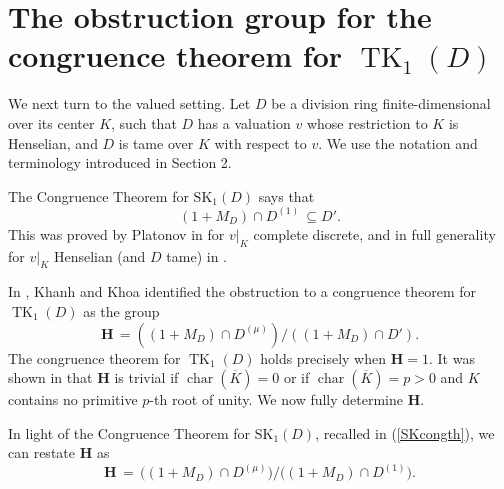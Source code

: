 \documentclass[11pt]{article}
\numberwithin{equation}{section}
\theoremstyle{plain}
\theoremstyle{remark}
\newcommand{\opn}{\operatorname}
\newcommand{\SK}{\opn{SK_1}}
\newcommand{\Dmu}{D^{(\mu)}}
\newcommand{\charr}{\opn{char}}
\newcommand{\ov}{\overline}
\newcommand{\bH}{\mathbf{H}}
\begin{document}
\section{The obstruction group for the congruence theorem for $\operatorname{TK}_1(D)$}\label{sec:obstruction-group}

We next turn to the valued setting.  Let $D$ be a division ring finite-dimensional over its center $K$,  such that 
$D$ has a valuation $v$ whose restriction to $K$ is Henselian, and $D$ is tame over $K$ with respect to $v$.
We use the notation and terminology introduced in Section 2. 

The Congruence Theorem for $\SK(D)$ says that 
\begin{equation}
\label{SKcongth}
(1+M_D) \cap D^{(1)} \, \subseteq D'.
\end{equation}
This was proved by Platonov in \cite{platonov-1976} for $v|_K$ complete discrete, and in full generality for $v|_K$
Henselian (and $D$ tame) in \cite{hazrat-wadsworth-2011}.  



In \cite{khanh-khoa-2025}, Khanh and Khoa identified the obstruction to a congruence theorem for 
$\operatorname{TK}_1(D)$
as the group 
$$
 \bH\,=((1+M_D)\cap D^{(\mu)})\big/((1+M_D)\cap D').
$$
The congruence theorem for $\operatorname{TK}_1(D)$ holds precisely when $\mathbf{H}=1$. 
It was shown in \cite{khanh-khoa-2025} that $\bH$ is trivial if $\charr(\ov K) = 0$ or if 
$\charr(\ov K) = p>0$ and $K$ contains no primitive $p$-th root of unity.
We now fully determine $\bH$.

In light of the Congruence Theorem for $\SK(D)$, recalled in (\ref{SKcongth}),
we can restate $\bH$ as 
\begin{equation}
\label{Hrestated}
        \mathbf{H}\,=\,\big((1+M_D)\cap \Dmu\big)\big/\big((1+M_D)\cap D^{(1)}\big).
\end{equation}
\end{document}
